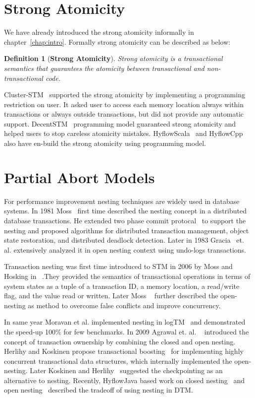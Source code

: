 \documentclass[12pt,english]{report}
\newtheorem{definition}{Definition}[section]
\begin{document}
\section{Strong Atomicity}
We have already introduced the strong atomicity informally in chapter~\ref{chap:intro}. Formally strong atomicity can be described as below:

\begin{definition}[\textbf{Strong Atomicity}] 
Strong atomicity is a transactional semantics that guarantees the atomicity between transactional and non-transactional code.
\end{definition}

Cluster-STM~\cite{Bocchino:2008:STM:1345206.1345242} supported the strong atomicity by implementing a programming restriction on user. It asked user to access each memory location always within transactions or always outside transactions, but did not provide any automatic support. DecentSTM~\cite{DecentSTM:5470446} programming model guaranteed strong atomicity and helped users to stop careless atomicity mistakes. HyflowScala~\cite{turcuhyflow2} and HyflowCpp also have en-build the strong atomicity using programming model.

\section{Partial Abort Models}

For performance improvement nesting techniques are widely used in database systems. In 1981 Moss~\cite{moss1981nested} first time described the nesting concept in a distributed database transactions. He extended two phase commit protocal~\cite{TwoPC:weikum1991principles} to support the nesting and proposed algorithms for distributed transaction management, object state restoration, and distributed deadlock detection. Later in 1983 Gracia~\cite{garcia1983using} et. al. extensively analyzed it in open nesting context using undo-logs transactions. 

Transaction nesting was first time introduced to STM in 2006 by  Moss and Hosking in ~\cite{moss2006nested}.They provided the semantics of transactional operations in terms of system states as a tuple of a transaction ID, a memory location, a read/write flag, and the value read or written. Later Moss ~\cite{moss2006open} further described the open-nesting as method to overcome false conflicts and improve concurrency. 

In same year Moravan et al. implemented nesting in logTM~\cite{moravan2006supporting} and demonstrated the speed-up 100\% for few benchmarks. In 2009 Agrawal et. al. ~\cite{agrawal2009safe} introduced the concept of transaction ownership by combining the closed and open nesting. Herlihy and Koskinen propose transactional boosting~\cite{herlihy2008transactional} for implementing highly concurrent transactional data structures, which internally implemented the open-nesting. Later Koskinen and Herlihy~\cite{koskinen2008checkpoints} suggested the checkpointing as an alternative to nesting. Recently, HyflowJava based work on closed nesting~\cite{turcu2012closed} and open nesting~\cite{turcu2012open} described the tradeoff of using nesting in DTM. 
\end{document}
